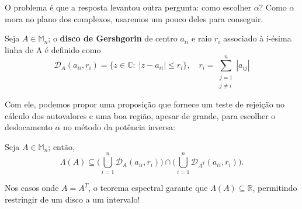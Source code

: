 \documentclass[../numerical_methods.tex]{subfiles}
\begin{document}
O problema é que a resposta levantou outra pergunta: como escolher \(\alpha \)? Como \(\alpha \) mora no plano dos complexos, usaremos um pouco deles para conseguir.
\begin{def*}
	Seja \(A\in \mathbb{M}_{n}\); o \textbf{disco de Gershgorin} de centro \(a_{ii}\) e raio \(r_{i}\) associado à i-ésima linha de A é definido como
	\[
		\mathcal{D}_{A}(a_{ii}, r_{i}) = \{z\in \mathbb{C}:\; | z-a_{ii} | \leq r_{i}\},  \quad r_{i} = \sum\limits_{\substack{j=1 \\ j\neq i}}^{n} | a_{ij} |
	\]
\end{def*}
Com ele, podemos propor uma proposição que fornece um teste de rejeição no cálculo dos autovalores e uma boa região, apesar de grande, para escolher o deslocamento \(\alpha \) no método da potência inversa:
\begin{prop*}
	Seja \(A\in \mathbb{M}_{n}\); então,
	\[
		\Lambda (A) \subseteq \biggl(\bigcup_{i=1}^{n}\mathcal{D}_{A}(a_{ii}, r_{i})\biggr)\cap \biggl(\bigcup_{i=1}^{n}\mathcal{D}_{A^{T}}(a_{ii}, r_{i})\biggr).
	\]
\end{prop*}
Nos casos onde \(A=A^{T}\), o teorema espectral garante que \(\Lambda (A)\subseteq \mathbb{R}\), permitindo restringir de um disco a um intervalo!
\end{document}
